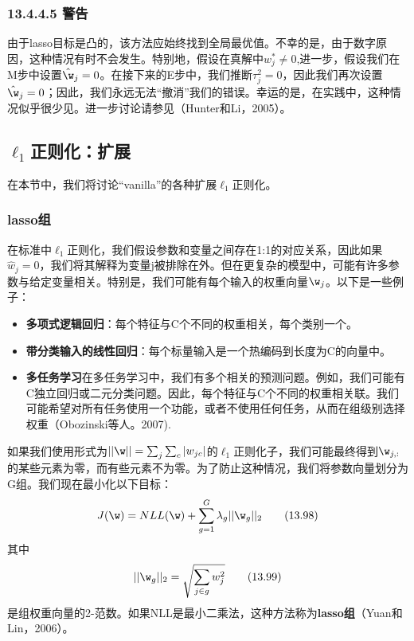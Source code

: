\documentclass[a4paper]{article}
\begin{document}
\subsubsection*{13.4.4.5  警告}
由于lasso目标是凸的，该方法应始终找到全局最优值。不幸的是，由于数字原因，这种情况有时不会发生。特别地，假设在真解中$w_j^*\ne 0$,进一步，假设我们在M步中设置$\hat{\w}_j=0$。在接下来的E步中，我们推断$\tau_j^2=0$，因此我们再次设置$\hat{\w}_j=0$；因此，我们永远无法“撤消”我们的错误。幸运的是，在实践中，这种情况似乎很少见。进一步讨论请参见（Hunter和Li，2005）。

\subsection{$\ell_1$正则化：扩展}
在本节中，我们将讨论“vanilla”的各种扩展$\ell_1$正则化。
\subsubsection{lasso组}
在标准中$\ell_1$正则化，我们假设参数和变量之间存在1:1的对应关系，因此如果$\hat{w}_j=0$，我们将其解释为变量j被排除在外。但在更复杂的模型中，可能有许多参数与给定变量相关。特别是，我们可能有每个输入的权重向量$\w_j$。以下是一些例子：
\begin{itemize}
\item \textbf{多项式逻辑回归}：每个特征与C个不同的权重相关，每个类别一个。
\item \textbf{带分类输入的线性回归}：每个标量输入是一个热编码到长度为C的向量中。
\item \textbf{多任务学习}在多任务学习中，我们有多个相关的预测问题。例如，我们可能有C独立回归或二元分类问题。因此，每个特征与C个不同的权重相关联。我们可能希望对所有任务使用一个功能，或者不使用任何任务，从而在组级别选择权重（Obozinski等人。2007).
\end{itemize}

如果我们使用形式为$||\w||=\sum\nolimits_{j}\sum\nolimits_{c}|w_{jc}|$的$\ell_1$正则化子，我们可能最终得到$\w_{j,:}$的某些元素为零，而有些元素不为零。为了防止这种情况，我们将参数向量划分为G组。我们现在最小化以下目标：
\begin{equation}
	J(\w)=NLL(\w)+\sum_{g=1}^{G}\lambda_g||\w_g||_2\tag{13.98}
\end{equation}
其中
\begin{equation}
	||\w_g||_2=\sqrt{\sum_{j\in g}w_j^2}\tag{13.99}
\end{equation}
是组权重向量的2-范数。如果NLL是最小二乘法，这种方法称为\textbf{lasso组}（Yuan和Lin，2006）。
\end{document}
